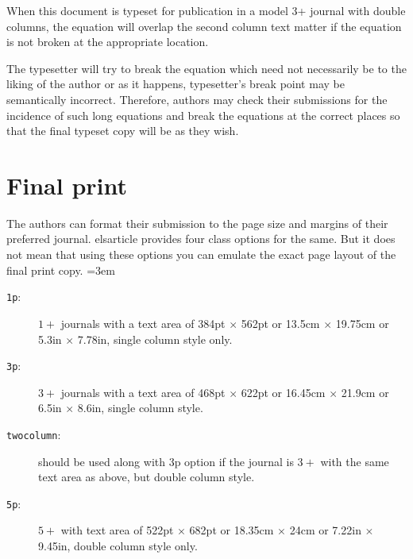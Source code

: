 \documentclass[a4paper,12pt]{article}
\def\file#1{\textsf{#1}\xspace}
\begin{document}
\bigskip
\setlength\Sep{6pt}
\def\rulecolor{blue!70}
\def\rulecolor{orange}
                 	
\noindent When this document is typeset for publication in a
model 3+ journal with double columns, the equation will overlap
the second column text matter if the equation is not broken at
the appropriate location.

\vspace*{6pt}
\def\rulecolor{blue!70}
\def\rulecolor{orange}

\pagebreak

\noindent The typesetter will try to break the equation which
need not necessarily be to the liking of the author or as it
happens, typesetter's break point may be semantically incorrect.
Therefore, authors may check their submissions for the incidence
of such long equations and break the equations at the correct
places so that the final typeset copy will be as they wish.

\section{Final print}\label{sec:final}

The authors can format their submission to the page size and margins
of their preferred journal.  \file{elsarticle} provides four
class options for the same. But it does not mean that using these
options you can emulate the exact page layout of the final print copy. 
\lmrgn=3em
\begin{description}
\item [\texttt{1p}:] $1+$ journals with a text area of
384pt $\times$ 562pt or 13.5cm $\times$ 19.75cm or 5.3in $\times$
7.78in, single column style only.

\item [\texttt{3p}:] $3+$ journals with a text area of 468pt
$\times$ 622pt or 16.45cm $\times$ 21.9cm or 6.5in $\times$
8.6in, single column style.

\item [\texttt{twocolumn}:] should be used along with 3p option if the
journal is $3+$ with the same text area as above, but double column
style. 

\item [\texttt{5p}:] $5+$ with text area of 522pt $\times$
682pt or 18.35cm $\times$ 24cm or 7.22in $\times$ 9.45in,
double column style only.
\end{description}
\end{document}
